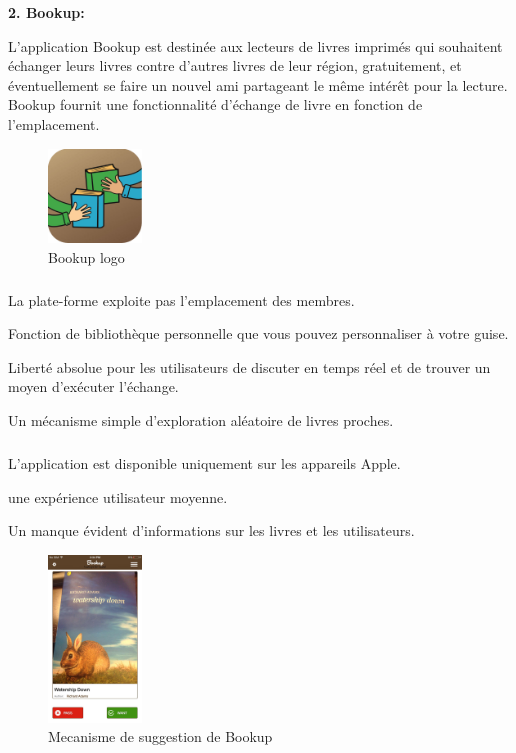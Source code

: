 {\large \textbf{2. Bookup:\\}}

\tab L'application Bookup est destinée aux lecteurs de livres imprimés qui souhaitent échanger leurs livres contre d'autres livres de leur région, gratuitement, et éventuellement se faire un nouvel ami partageant le même intérêt pour la lecture. Bookup fournit une fonctionnalité d’échange de livre en fonction de l’emplacement.
\begin{figure}[h]
\begin{center}
\includegraphics[width=2.5cm]{Images/chapter1/bookUpLogo.jpg}
\caption{Bookup logo}
\end{center}
\end{figure}

\subparagraph*{}
\begin{list}{•}{\textbf{Avantages}}
\item La plate-forme exploite pas l'emplacement des membres.
\item Fonction de bibliothèque personnelle que vous pouvez personnaliser à votre guise.
\item Liberté absolue pour les utilisateurs de discuter en temps réel et de trouver un moyen d'exécuter l'échange.
\item Un mécanisme simple d'exploration aléatoire de livres proches.
\end{list}

\subparagraph*{}
\begin{list}{•}{\textbf{Inconvénients}}
\item L'application est disponible uniquement sur les appareils Apple.
\item une expérience utilisateur moyenne.
\item Un manque évident d'informations sur les livres et les utilisateurs.
\end{list}

\begin{figure}[h]
\begin{center}
\includegraphics[width=2.5cm]{Images/chapter1/bookUpScreenshot.jpg}
\caption{Mecanisme de suggestion de Bookup}
\end{center}
\end{figure}
